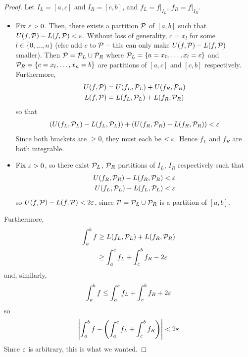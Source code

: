 \documentclass{../template/note}
\begin{document}
    \begin{proof}
        Let \(I_L = [a, c]\) and \(I_R = [c, b]\), and \(f_L = \left.f\right|_{I_L}\), \(f_R = \left.f\right|_{I_R}\).
        \begin{itemize}
            \item[\(\implies\)] Fix \(\varepsilon > 0\). Then, there exists a partition \(\mathcal{P}\) of \([a, b]\) such that \(U(f, \mathcal{P}) - L(f, \mathcal{P}) < \varepsilon\). Without loss of generality, \(c = x_l\) for some \(l \in \{0, \dots, n\}\) (else add \(c\) to \(\mathcal{P}\) -- this can only make \(U(f, \mathcal{P}) - L(f, \mathcal{P})\) smaller). Then \(\mathcal{P} = \mathcal{P}_L \cup \mathcal{P}_R\) where \(\mathcal{P}_L = \{a = x_0, \dots, x_l = c\}\) and \(\mathcal{P}_R = \{c = x_l, \dots, x_n = b\}\) are partitions of \([a, c]\) and \([c, b]\) respectively. Furthermore,
            \begin{align*}
                U(f, \mathcal{P}) &= U(f_L, \mathcal{P}_L) + U(f_R, \mathcal{P}_R) \\
                L(f, \mathcal{P}) &= L(f_L, \mathcal{P}_L) + L(f_R, \mathcal{P}_R)
            \end{align*}
            so that
            \begin{align*}
                \left(U(f_L, \mathcal{P}_L)-L(f_L, \mathcal{P}_L)\right) + \left(U(f_R, \mathcal{P}_R)-L(f_R, \mathcal{P}_R)\right) < \varepsilon
            \end{align*}
            Since both brackets are \(\geq 0\), they must each be \(< \varepsilon\). Hence \(f_L\) and \(f_R\) are both integrable.

            \item[\(\impliedby\)] Fix \(\varepsilon > 0\), so there exist \(\mathcal{P}_L\), \(\mathcal{P}_R\) partitions of \(I_L\), \(I_R\) respectively such that
            \begin{align*}
                U(f_R, \mathcal{P}_R) - L(f_R, \mathcal{P}_R) &< \varepsilon \\
                U(f_L, \mathcal{P}_L) - L(f_L, \mathcal{P}_L) &< \varepsilon
            \end{align*}
            so \(U(f, \mathcal{P}) - L(f, \mathcal{P}) < 2\varepsilon\), since \(\mathcal{P} = \mathcal{P}_L \cup \mathcal{P}_R\) is a partition of \([a, b]\). 
        \end{itemize}
        Furthermore,
        \begin{align*}
            \int_a^b f &\geq L(f_L, \mathcal{P}_L) + L(f_R, \mathcal{P}_R) \\
            &\geq \int_a^c f_L + \int_c^b f_R - 2\varepsilon
        \end{align*}
        and, similarly,
        \begin{align*}
            \int_a^b f \leq \int_a^c f_L + \int_c^b f_R + 2\varepsilon
        \end{align*}
        so
        \begin{align*}
            \left|\int_a^b f - \left(\int_a^c f_L + \int_c^b f_R\right)\right| < 2\varepsilon
        \end{align*}
        Since \(\varepsilon\) is arbitrary, this is what we wanted.        
    \end{proof}
\end{document}
